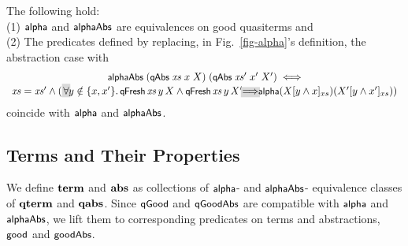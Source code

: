 \documentclass{llncs}
\newcommand\coll[1]{\mbox{\colorbox{light-gray}{$\!#1\!$}}}
\begin{document}
\begin{prop}\rm \label{lem-alpha}
The following hold: 
\\(1) $\mbox{\rm\textsf{\small alpha}}$ and $\mbox{\rm\textsf{\small alphaAbs}}$ are equivalences on good quasiterms and \abstractions{}
\\(2) The predicates defined by replacing, in Fig.~\ref{fig-alpha}'s definition, the abstraction 
case with  
$$
\begin{array}{c}
\alAbs\;(\qAbs\;\xs\;x\;X)\;(\qAbs\;\xs'\;x'\;X')  \;\iff
\\
    \xs = \xs' \wedge (\coll{\forall}\! y \notin \{x,x'\}.\, \qFresh\,\xs\,y\,X \wedge
 \qFresh\,\xs\,y\,X' \!\coll{\Lra}\! \al (X [ y \wedge x]_{xs}) (X' [ y \wedge x']_{xs})) 
\end{array}
$$
%
coincide with $\mbox{\rm\textsf{\small alpha}}$ and $\mbox{\rm\textsf{\small alphaAbs}}$. 
%
\end{prop}




\subsection{Terms and Their Properties}\label{subsec-termsTh} 


We define $\mbox{\bf term}$ and $\mbox{\bf abs}$ as collections %
of $\mbox{\rm\textsf{\small alpha}}$- and $\mbox{\rm\textsf{\small alphaAbs}}$- equivalence classes of $\mbox{\bf qterm}$ and $\mbox{\bf qabs}$. 
Since $\mbox{\rm\textsf{\small qGood}}$ and $\mbox{\rm\textsf{\small qGoodAbs}}$ are compatible with $\mbox{\rm\textsf{\small alpha}}$ and $\mbox{\rm\textsf{\small alphaAbs}}$, we %
lift them %
to corresponding predicates on terms and abstractions, $\mbox{\rm\textsf{\small good}}$ and $\mbox{\rm\textsf{\small goodAbs}}$. 
%

\end{document}
